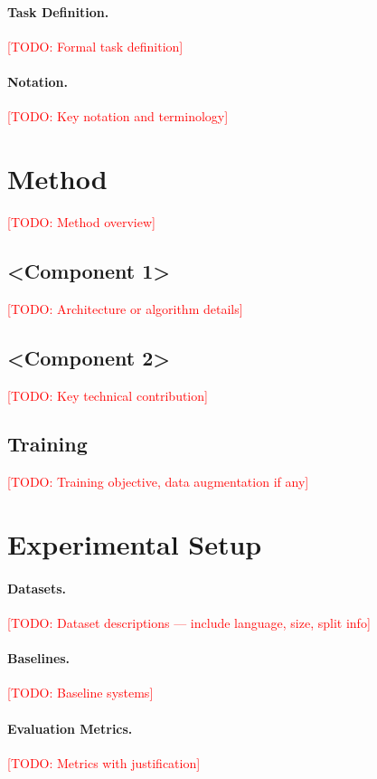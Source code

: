 \documentclass[11pt]{article}
\newcommand{\todo}[1]{\textcolor{red}{[TODO: #1]}}
\begin{document}
\paragraph{Task Definition.}
\todo{Formal task definition}

\paragraph{Notation.}
\todo{Key notation and terminology}

\section{Method}
\label{sec:method}

\todo{Method overview}

\subsection{<Component 1>}
\todo{Architecture or algorithm details}

\subsection{<Component 2>}
\todo{Key technical contribution}

\subsection{Training}
\todo{Training objective, data augmentation if any}

\section{Experimental Setup}
\label{sec:setup}

\paragraph{Datasets.}
\todo{Dataset descriptions — include language, size, split info}

\paragraph{Baselines.}
\todo{Baseline systems}

\paragraph{Evaluation Metrics.}
\todo{Metrics with justification}
\end{document}
